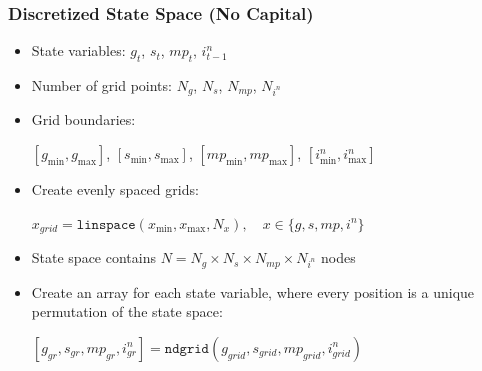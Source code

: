 \documentclass[11pt]{beamer}
\begin{document}
\begin{frame}\frametitle{Discretized State Space (No Capital)}

\begin{itemize}\setlength{\itemsep}{10pt}
  \item <1-|handout:1>State variables: $g_t$, $s_t$, $mp_t$, $i^n_{t-1}$
  \item <2-|handout:1>Number of grid points: $N_g$, $N_{s}$, $N_{mp}$, $N_{i^n}$
  \item <3-|handout:1>Grid boundaries: 
\begin{center}
$[g_{\min},g_{\max}]$, $[s_{\min},s_{\max}]$, $[mp_{\min},mp_{\max}]$, $[i^n_{\min},i^n_{\max}]$
\end{center}
  \item <4-|handout:1>Create evenly spaced grids:
  \begin{center}
    $x_{grid} = \texttt{linspace}(x_{\min},x_{\max},N_x), \quad x\in\{g,s,mp,i^n\}$
  \end{center}
  \item <5-|handout:1>State space contains $N=N_g\times N_s\times N_{mp}\times N_{i^n}$ nodes
  \item <6-|handout:1>Create an array for each state variable, where every position is a unique permutation of the state space:
  \begin{center}
    $[g_{gr},s_{gr},mp_{gr},i^n_{gr}] = \texttt{ndgrid}(g_{grid},s_{grid},mp_{grid},i^n_{grid})$
  \end{center}
\end{itemize}

\end{frame}
\end{document}
